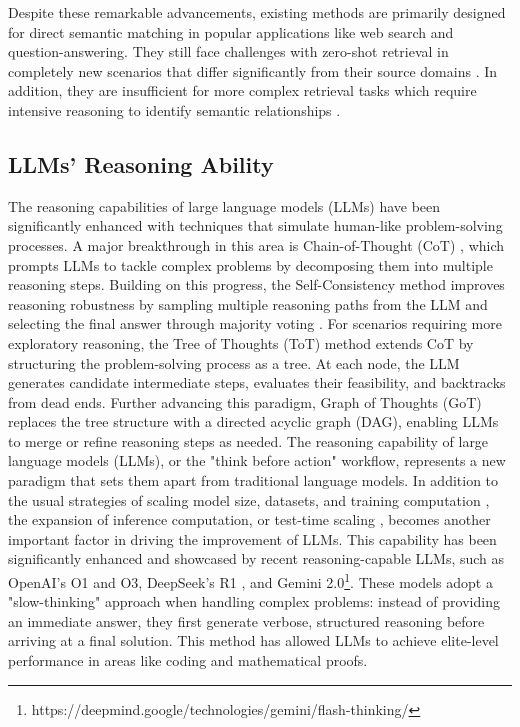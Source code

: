 Despite these remarkable advancements, existing methods are primarily designed for direct semantic matching in popular applications like web search and question-answering. They still face challenges with zero-shot retrieval in completely new scenarios that differ significantly from their source domains \cite{gao2022precise,zhu2023large}. In addition, they are insufficient for more complex retrieval tasks which require intensive reasoning to identify semantic relationships \cite{su2024bright}. 

\subsection{LLMs' Reasoning Ability} 
The reasoning capabilities of large language models (LLMs) have been significantly enhanced with techniques that simulate human-like problem-solving processes. A major breakthrough in this area is Chain-of-Thought (CoT) \cite{wei2022chain}, which prompts LLMs to tackle complex problems by decomposing them into multiple reasoning steps. Building on this progress, the Self-Consistency method improves reasoning robustness by sampling multiple reasoning paths from the LLM and selecting the final answer through majority voting \cite{feng2024towards}. For scenarios requiring more exploratory reasoning, the Tree of Thoughts (ToT) method \cite{yao2024tree} extends CoT by structuring the problem-solving process as a tree. At each node, the LLM generates candidate intermediate steps, evaluates their feasibility, and backtracks from dead ends. Further advancing this paradigm, Graph of Thoughts (GoT) \cite{besta2024graph} replaces the tree structure with a directed acyclic graph (DAG), enabling LLMs to merge or refine reasoning steps as needed. The reasoning capability of large language models (LLMs), or the "think before action" workflow, represents a new paradigm that sets them apart from traditional language models. In addition to the usual strategies of scaling model size, datasets, and training computation \cite{kaplan2020scaling, hoffmann2022training}, the expansion of inference computation, or test-time scaling \cite{wu2024inference, chen2024llmcallsneedscaling, sardana2023beyond}, becomes another important factor in driving the improvement of LLMs. This capability has been significantly enhanced and showcased by recent reasoning-capable LLMs, such as OpenAI's O1 and O3, DeepSeek's R1 \cite{guo2025deepseek}, and Gemini 2.0\footnote{https://deepmind.google/technologies/gemini/flash-thinking/}. These models adopt a "slow-thinking" approach when handling complex problems: instead of providing an immediate answer, they first generate verbose, structured reasoning before arriving at a final solution. This method has allowed LLMs to achieve elite-level performance in areas like coding and mathematical proofs. 

